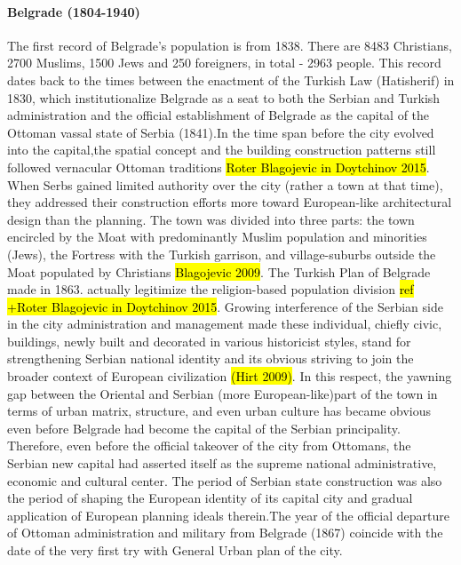 \documentclass[11pt]{report}
\begin{document}
\paragraph{Belgrade (1804-1940)}
The first record of Belgrade’s population is from 1838. There are 8483 Christians, 2700 Muslims, 1500 Jews and 250 foreigners, in total - 2963 people. This record dates back to the times between the enactment of the Turkish Law (Hatisherif) in 1830, which institutionalize Belgrade as a seat to both the Serbian and Turkish administration and the official establishment of Belgrade as the capital of the Ottoman vassal state of Serbia (1841).\footnotemark In the time span before the city evolved into the capital,the spatial concept and the building construction patterns still followed vernacular Ottoman traditions \hl{Roter Blagojevic in Doytchinov 2015}.
\\
When Serbs gained limited authority over the city (rather a town at that time), they addressed their construction efforts more toward European-like architectural design than the planning. The town was divided into three parts: the town encircled by the Moat with predominantly Muslim population and minorities (Jews), the Fortress with the Turkish garrison, and village-suburbs outside the Moat populated by Christians \hl{Blagojevic 2009}. The Turkish Plan of Belgrade made in 1863. actually legitimize the religion-based population division \hl{ref +Roter Blagojevic in Doytchinov 2015}.
Growing interference of the Serbian side in the city administration and management made these individual, chiefly civic, buildings, newly built and decorated in various historicist styles, stand for strengthening Serbian national identity and its obvious striving to join the broader context of European civilization \hl{(Hirt 2009)}. In this respect, the yawning gap between the Oriental and Serbian (more European-like)\footnotemark part of the town in terms of urban matrix, structure, and even urban culture has became obvious even before Belgrade had become the capital of the Serbian principality.
\\
Therefore, even before the official takeover of the city from Ottomans, the Serbian new capital had asserted itself as the supreme national administrative, economic and cultural center. The period of Serbian state construction was also the period of shaping the European identity of its capital city and gradual application of European planning ideals therein.\footnotemark The year of the official departure of Ottoman administration and military from Belgrade (1867) coincide with the date of the very first try with General Urban plan of the city.
\end{document}
